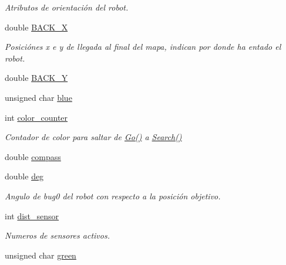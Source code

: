 \begin{DoxyCompactItemize}
\begin{DoxyCompactList}\small\item\em Atributos de orientación del robot. \end{DoxyCompactList}\item 
double \hyperlink{classRescue_acc6616f1ab243e26c8903faca1cc7feb_acc6616f1ab243e26c8903faca1cc7feb}{B\+A\+C\+K\+\_\+X}
\begin{DoxyCompactList}\small\item\em Posiciónes x e y de llegada al final del mapa, indican por donde ha entado el robot. \end{DoxyCompactList}\item 
double \hyperlink{classRescue_aab2477ae06d7c87401e2306f36261120_aab2477ae06d7c87401e2306f36261120}{B\+A\+C\+K\+\_\+Y}
\item 
unsigned char \hyperlink{classRescue_adeb74390f710b4a180605f4a68e1bc77_adeb74390f710b4a180605f4a68e1bc77}{blue}
\item 
int \hyperlink{classRescue_a180e2955648c5bae24069da9db0c1a5f_a180e2955648c5bae24069da9db0c1a5f}{color\+\_\+counter}
\begin{DoxyCompactList}\small\item\em Contador de color para saltar de \hyperlink{classRescue_acfe79ba42004fd73e17e240c0201462a_acfe79ba42004fd73e17e240c0201462a}{Go()} a \hyperlink{classRescue_a3ea9a01b97d0291afa704bff73564938_a3ea9a01b97d0291afa704bff73564938}{Search()} \end{DoxyCompactList}\item 
double \hyperlink{classRescue_a5783a7f93b5dc970e997a919af57e0bc_a5783a7f93b5dc970e997a919af57e0bc}{compass}
\item 
double \hyperlink{classRescue_ad6febda0e181e1b6847e1b9be0f54e2b_ad6febda0e181e1b6847e1b9be0f54e2b}{deg}
\begin{DoxyCompactList}\small\item\em Angulo de bug0 del robot con respecto a la posición objetivo. \end{DoxyCompactList}\item 
int \hyperlink{classRescue_ab1e1f44c42138628cf62b8d56430e776_ab1e1f44c42138628cf62b8d56430e776}{dist\+\_\+sensor}
\begin{DoxyCompactList}\small\item\em Numeros de sensores activos. \end{DoxyCompactList}\item 
unsigned char \hyperlink{classRescue_a5ec72c1115b4a89bd6079f74866b4717_a5ec72c1115b4a89bd6079f74866b4717}{green}

\end{DoxyCompactItemize}
